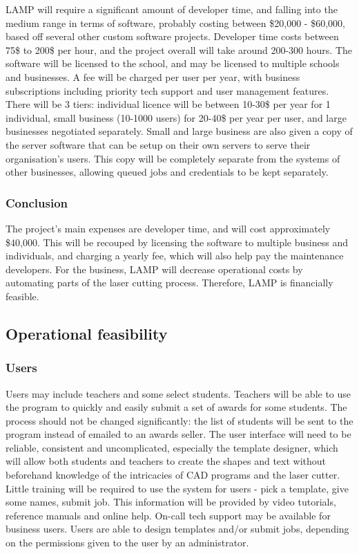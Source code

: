 \documentclass[oneside,openany,11pt,a4paper]{report}
\begin{document}
LAMP will require a significant amount of developer time, and falling into the medium range in terms of software, probably costing between \$20,000 - \$60,000, based off several other custom software projects. Developer time costs between 75\$ to 200\$ per hour, and the project overall will take around 200-300 hours. The software will be licensed to the school, and may be licensed to multiple schools and businesses. A fee will be charged per user per year, with business subscriptions including priority tech support and user management features. There will be 3 tiers: individual licence will be between 10-30\$ per year for 1 individual, small business (10-1000 users) for 20-40\$ per year per user, and large businesses negotiated separately. Small and large business are also given a copy of the server software that can be setup on their own servers to serve their organisation’s users. This copy will be completely separate from the systems of other businesses, allowing queued jobs and credentials to be kept separately.

\subsubsection{Conclusion}
The project’s main expenses are developer time, and will cost approximately \$40,000. This will be recouped by licensing the software to multiple business and individuals, and charging a yearly fee, which will also help pay the maintenance developers. For the business, LAMP will decrease operational costs by automating parts of the laser cutting process. Therefore, LAMP is financially feasible.

\subsection{Operational feasibility}
\subsubsection{Users}
Users may include teachers and some select students. Teachers will be able to use the program to quickly and easily submit a set of awards for some students. The process should not be changed significantly: the list of students will be sent to the program instead of emailed to an awards seller. The user interface will need to be reliable, consistent and uncomplicated, especially the template designer, which will allow both students and teachers to create the shapes and text without beforehand knowledge of the intricacies of CAD programs and the laser cutter. Little training will be required to use the system for users - pick a template, give some names, submit job. This information will be provided by video tutorials, reference manuals and online help. On-call tech support may be available for business users. Users are able to design templates and/or submit jobs, depending on the permissions given to the user by an administrator.
\end{document}
